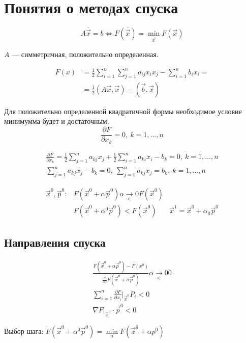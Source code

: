 \section{Понятия о методах спуска}

\[  
  A \overline{\vec{x}} = b \iff F(\overline{\vec{x}}) = \min_{\vec{x}}
  F(\vec{x})
\]

$A$ --- симметричная, положительно определенная.

\begin{align*}
  F(x) &= \frac 12 \sum_{i = 1}^n \sum_{j = 1}^n a_{ij} x_i x_j - \sum_{i = 1}^n b_i x_i =\\ 
       &= \frac 12 (A\vec{x}, \vec{x}) - (\vec{b}, \vec{x})
\end{align*}

Для положительно определенной квадратичной формы необходимое условие минимумма
будет и достаточным.
\[
  \frac{\partial F}{\partial x_k} = 0,\ k = 1, \dotsc, n
\]

\begin{gather*}
  \frac{\partial F}{\partial x_k} = \frac 12 \sum_{j = 1}^n a_{kj}x_j + \frac 12
  \sum_{i = 1}^n a_{ki}x_i - b_k = 0,\ k = 1,\dotsc, n \\
  \sum_{j = 1}^n a_{kj} x_j - b_k = 0,\ \sum_{j = 1}^n a_{kj}x_j = b_k,\ k = 1,
  \dotsc, n
\end{gather*}

\begin{align*}
  \vec{x}^0, \vec{p}^0: &F(\vec{x}^0 + \alpha \vec{p}^0) \underset{<}{\alpha \to
                          0} F(\vec{x}^0)\\
                        &F(\vec{x}^0 + \alpha^0 \vec{p}^0) < F(\vec{x}^0)
                        &\vec{x}^1 = \vec{x}^0 + \alpha_0 \vec{p}^0
\end{align*}

\subsection{Направления спуска}
\begin{gather*}
  \frac{F(\vec{x}^0 + \alpha \vec{p}^0) - F(x^0)}{\frac{d}{d\alpha} F(\vec{x}^0
    + \alpha \vec{p}^0)} \underset{<}{\alpha \to 0} 0 \\
  \sum_{i = 1}^n \frac{\partial F}{\partial x_i} |_{\vec{x}^0} P_i < 0\\
  \nabla F |_{\vec{x}^0} \cdot \vec{p}^0 < 0
\end{gather*}

Выбор шага: $F(\vec x^0 + \alpha^0 \vec p^0) = \min\limits_\alpha F(\vec x^0 + \alpha p^0)$

